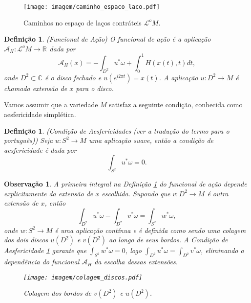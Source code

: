 \documentclass[12pt]{book}
\newtheorem{definicao}[teorema]{Definição}
\newtheorem{observacao}[teorema]{Observação}
\newcommand{\funcionalH}{\mathcal{A}_{H}}
\newcommand{\funcionalHponto}[1]{\mathcal{A}_{H}(#1)}
\newcommand{\real}[1]{\mathbb{R}^{#1}}
\newcommand{\reta}{\real{}}
\newcommand{\lacocontrateis}{\mathcal{L}^{o}M}
\newcommand{\alerta}[1]{{\color{red}#1}}
\begin{document}
	\begin{figure}[!h]
		\centering
		\texttt{[image: imagem/caminho\_espaco\_laco.pdf]}
		\caption{Caminhos no espaço de laços contráteis $\lacocontrateis$.}
		\label{figura_caminho_espaco_laco_contrateis}
	\end{figure} 
	
	\begin{definicao}\label{definicao_funcional_hamiltoniano}
		(Funcional de Ação) O funcional de ação é a aplicação $\funcionalH: \lacocontrateis\to \reta$ dada por
		$$
		\funcionalHponto{x} = -\int_{D^{2}}u^{*}\omega + \int_{0}^{1}H(x(t), t)dt,
		$$
		onde $D^{2} \subset \mathbb{C}$ é o disco fechado e $u(e^{i2\pi t})=x(t)$. A aplicação $u:D^{2}\to M$ é chamada extensão de $x$ para o disco.
	\end{definicao}
	
	Vamos assumir que a variedade $M$ satisfaz a seguinte condição, conhecida como aesfericidade simplética.
	
	\begin{definicao}\label{definicao_condicao_aesfericidade}
		(Condição de \alerta{Aesfericidades (ver a tradução do termo para o português)}) Seja $u:S^{2} \to M$ uma aplicação suave, então a condição de aesfericidade é dada por 
		$$
		\int_{S^{2}} u^{*}\omega = 0.
		$$
	\end{definicao}
	
	\begin{observacao}
		A primeira integral na Definição \ref{definicao_funcional_hamiltoniano} do funcional de ação depende explicitamente da extensão de $x$ escolhida. Supondo que $v : D^{2}\to M$ é outra extensão de $x$, então
		$$
		\int_{D^{2}}u^{*}\omega - \int_{D^{2}}v^{*}\omega  = \int_{S^{2}}w^{*}\omega, 
		$$
		onde $w:S^{2} \to M$ é uma aplicação contínua e é definida como sendo uma colagem dos dois discos $u(D^{2})$ e $v(D^{2})$ ao longo de seus bordos. A Condição de Aesfericidade \ref{definicao_condicao_aesfericidade} garante que $\int_{S^{2}}w^{*}\omega=0$, logo $\int_{D^{2}}u^{*}\omega = \int_{D^{2}}v^{*}\omega$, eliminando a dependência do funcional $\funcionalH$ da escolha dessas extensões.
		
		\begin{figure}[!h]
			\centering
			\texttt{[image: imagem/colagem\_discos.pdf]}
			\caption{Colagem dos bordos de $v(D^{2})$ e $u(D^{2})$.}
		\end{figure}
	\end{observacao}
	
\end{document}
